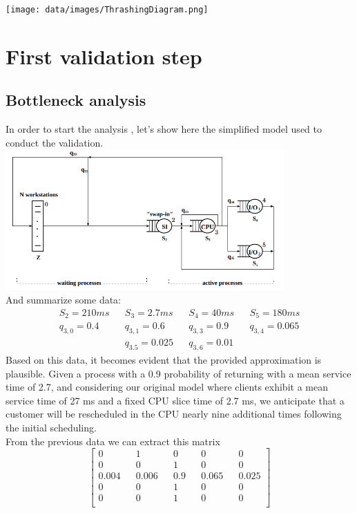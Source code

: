 \documentclass[12pt,a4paper]{article}
\begin{document}
\texttt{[image: data/images/ThrashingDiagram.png]}


\section{First validation step}
\subsection{Bottleneck analysis}
In order to start the analysis , let's show here the simplified model
used to conduct the validation.
\includegraphics[width=0.8\textwidth]{Images/simplified_model.png}
\\And summarize some data:
\begin{displaymath}
    \begin{aligned}
        S_2 = 210ms  &  & S_3= 2.7ms     &  & S_4 = 40ms    &  & S_5=180ms      \\
        q_{3,0}= 0.4 &  & q_{3,1}=0.6    &  & q_{3,3} = 0.9 &  & q_{3,4}= 0.065 \\
                     &  & q_{3.5}= 0.025 &  & q_{3,6}=0.01  &  &
    \end{aligned}
\end{displaymath}
Based on this data, it becomes evident that the provided approximation is plausible. Given a process with a 0.9 probability of returning with a mean service time of 2.7, and considering our original model where clients exhibit a mean service time of 27 ms and a fixed CPU slice time of 2.7 ms, we anticipate that a customer will be rescheduled in the CPU nearly nine additional times following the initial scheduling. \\

From the previous data we can extract this matrix
\begin{displaymath}
    \begin{bmatrix}
        0     &  & 1     &  & 0   &  & 0     &  & 0     \\
        0     &  & 0     &  & 1   &  & 0     &  & 0     \\
        0.004 &  & 0.006 &  & 0.9 &  & 0.065 &  & 0.025 \\
        0     &  & 0     &  & 1   &  & 0     &  & 0     \\
        0     &  & 0     &  & 1   &  & 0     &  & 0     \\
    \end{bmatrix}
\end{displaymath}
\end{document}
